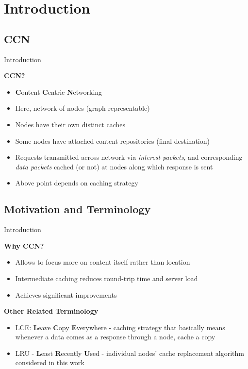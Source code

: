 \documentclass[
	xcolor={svgnames},
	hyperref={pagebackref,bookmarks},
	aspectratio=43,
]{beamer}
\begin{document}
\section{Introduction}
\subsection*{CCN}
\begin{frame}{Introduction}
	\begin{block}{\textbf{CCN?}}
		\begin{itemize}
		    \item \textbf{C}ontent \textbf{C}entric \textbf{N}etworking
            \item Here, network of nodes (graph representable)
            \item Nodes have their own distinct caches
            \item Some nodes have attached content repositories (final destination)
            \item Requests transmitted across network via \textit{interest packets}, and corresponding \textit{data packets} cached (or not) at nodes along which response is sent
            \item Above point depends on caching strategy
		\end{itemize}
	\end{block}
\end{frame}

\subsection*{Motivation and Terminology}
\begin{frame}{Introduction}
    \begin{block}{\textbf{Why CCN?}}
        \begin{itemize}
            \item Allows to focus more on content itself rather than location
            \item Intermediate caching reduces round-trip time and server load
            \item Achieves significant improvements \footnotemark
        \end{itemize}
    
    \end{block}
    \begin{block}{\textbf{Other Related Terminology}}
        \begin{itemize}
            \item LCE: \textbf{L}eave \textbf{C}opy \textbf{E}verywhere - caching strategy that basically means whenever a data comes as a response through a node, cache a copy
            \item LRU - \textbf{L}east \textbf{R}ecently \textbf{U}sed - individual nodes' cache replacement algorithm considered in this work 
        \end{itemize}
    \end{block}
\end{frame}
\end{document}
